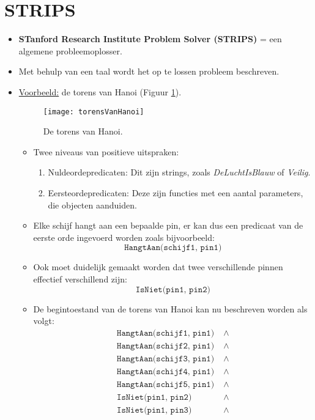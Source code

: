 \section{STRIPS}
\begin{itemize}
	\item \textbf{STanford Research Institute Problem Solver (STRIPS)} = een algemene probleemoplosser.
	\item Met behulp van een taal wordt het op te lossen probleem beschreven.
	\item \underline{Voorbeeld:} de torens van Hanoi (Figuur \ref{fig:torensVanHanoi}).
	\begin{figure}[h]
		\centering
		\texttt{[image: torensVanHanoi]}
		\caption{De torens van Hanoi.}
		\label{fig:torensVanHanoi}
	\end{figure}
	\begin{itemize}
		\item Twee niveaus van positieve uitspraken:
		\begin{enumerate}
			\item Nuldeordepredicaten: Dit zijn strings, zoals \textit{DeLuchtIsBlauw} of \textit{Veilig}.
			\item Eersteordepredicaten: Deze zijn functies met een aantal parameters, die objecten aanduiden.
		\end{enumerate}
		\item Elke schijf hangt aan een bepaalde pin, er kan dus een predicaat van de eerste orde ingevoerd worden zoals bijvoorbeeld:
		$$\texttt{HangtAan(schijf1, pin1)}$$
		\item Ook moet duidelijk gemaakt worden dat twee verschillende pinnen effectief verschillend zijn:
		$$\texttt{IsNiet(pin1, pin2)}$$
		\item De begintoestand van de torens van Hanoi kan nu beschreven worden als volgt:
		\begin{equation*}
			\begin{split}
				\texttt{HangtAan(schijf1, pin1)}& \;\wedge \\
				\texttt{HangtAan(schijf2, pin1)}& \;\wedge \\
				\texttt{HangtAan(schijf3, pin1)}& \;\wedge \\
				\texttt{HangtAan(schijf4, pin1)}& \;\wedge \\
				\texttt{HangtAan(schijf5, pin1)}& \;\wedge \\
				\texttt{IsNiet(pin1, pin2)}& \;\wedge \\
				\texttt{IsNiet(pin1, pin3)}& \;\wedge \\

\end{split}
\end{equation*}
\end{itemize}
\end{itemize}

